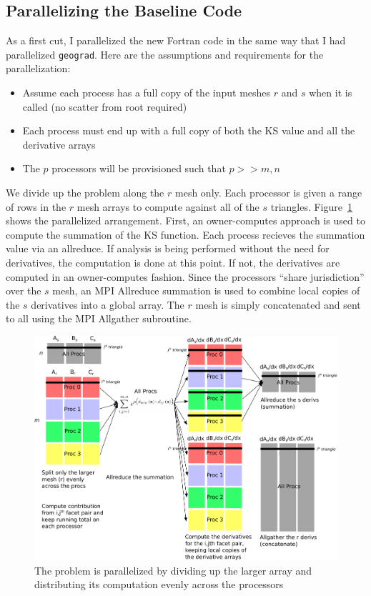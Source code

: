 \documentclass[11pt,letterpaper]{article}
\begin{document}
\subsection{Parallelizing the Baseline Code}
\qquad As a first cut, I parallelized the new Fortran code in the same way that I had parallelized \texttt{geograd}.
Here are the assumptions and requirements for the parallelization:
\begin{itemize}
  \item Assume each process has a full copy of the input meshes $r$ and $s$ when it is called (no scatter from root required)
  \item Each process must end up with a full copy of both the KS value and all the derivative arrays
  \item The $p$ processors will be provisioned such that $p >> m, n$
\end{itemize}
\qquad We divide up the problem along the $r$ mesh only.
Each processor is given a range of rows in the $r$ mesh arrays to compute against all of the $s$ triangles.
Figure~\ref{fig:parallel} shows the parallelized arrangement.
First, an owner-computes approach is used to compute the summation of the KS function.
Each process recieves the summation value via an allreduce.
If analysis is being performed without the need for derivatives, the computation is done at this point.
If not, the derivatives are computed in an owner-computes fashion.
Since the processors ``share jurisdiction'' over the $s$ mesh, an MPI Allreduce summation is used to combine local copies of the $s$ derivatives into a global array.
The $r$ mesh is simply concatenated and sent to all using the MPI Allgather subroutine.

\begin{figure}[ht]
  \centering
  \includegraphics[width=0.95\linewidth]{figures/parallelization}
  \caption{The problem is parallelized by dividing up the larger array and distributing its computation evenly across the processors}
  \label{fig:parallel}
\end{figure}
\end{document}
